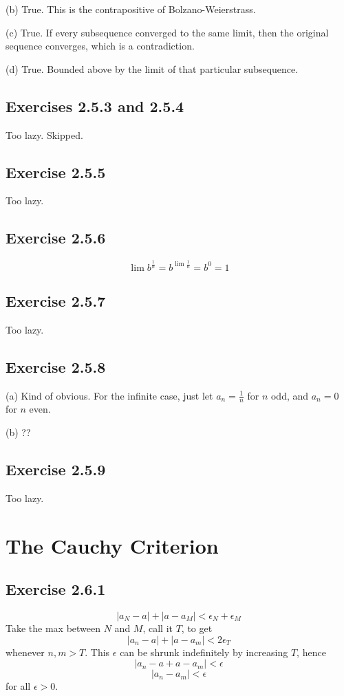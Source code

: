 \documentclass{book}
\begin{document}
\noindent
(b)
True. This is the contrapositive of Bolzano-Weierstrass.

\noindent
(c)
True. If every subsequence converged to the same limit, then the original sequence converges, which is a contradiction.

\noindent
(d)
True. Bounded above by the limit of that particular subsequence.

\subsection*{Exercises 2.5.3 and 2.5.4}
Too lazy. Skipped.

\subsection*{Exercise 2.5.5}
Too lazy.

\subsection*{Exercise 2.5.6}
$$\lim b^{\frac{1}{n}} = b^{\lim \frac{1}{n}} = b^0 = 1$$

\subsection*{Exercise 2.5.7}
Too lazy.

\subsection*{Exercise 2.5.8}
(a)
Kind of obvious. For the infinite case, just let $a_n = \frac{1}{n}$ for $n$ odd, and $a_n = 0$ for $n$ even.

\noindent
(b)
??

\subsection*{Exercise 2.5.9}
Too lazy.

\section{The Cauchy Criterion}

\subsection*{Exercise 2.6.1}
$$|a_N - a| + |a - a_M| < \epsilon_N + \epsilon_M$$
Take the max between $N$ and $M$, call it $T$, to get
$$|a_n - a| + |a - a_m| < 2 \epsilon_T$$
whenever $n, m > T$. This $\epsilon$ can be shrunk indefinitely by increasing $T$, hence
$$|a_n - a + a - a_m| < \epsilon$$
$$|a_n - a_m| < \epsilon$$
for all $\epsilon > 0$.
\end{document}
